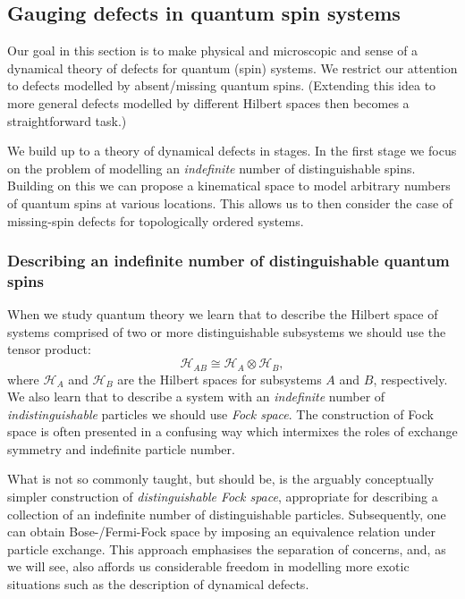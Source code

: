 
\subsection{Gauging defects in quantum spin systems}

Our goal in this section is to make physical and microscopic and sense of a dynamical theory of defects for quantum (spin) systems. We restrict our attention to defects modelled by absent/missing quantum spins. (Extending this idea to more general defects modelled by different Hilbert spaces then becomes a straightforward task.)

We build up to a theory of dynamical defects in stages. In the first stage we focus on the problem of modelling an \emph{indefinite} number of distinguishable spins. Building on this we can propose a kinematical space to model arbitrary numbers of quantum spins at various locations. This allows us to then consider the case of missing-spin defects for topologically ordered systems.

\subsubsection{Describing an indefinite number of distinguishable quantum spins}

When we study quantum theory we learn that to describe the Hilbert space of systems comprised of two or more distinguishable subsystems we should use the tensor product:
\begin{equation}
	\mathcal{H}_{AB} \cong \mathcal{H}_A\otimes \mathcal{H}_B,
\end{equation}
where $\mathcal{H}_A$ and $\mathcal{H}_B$ are the Hilbert spaces for subsystems $A$ and $B$, respectively. We also learn that to describe a system with an \emph{indefinite} number of \emph{indistinguishable} particles we should use \emph{Fock space}. The construction of Fock space is often presented in a confusing way which intermixes the roles of exchange symmetry and indefinite particle number.

What is not so commonly taught, but should be, is the arguably conceptually simpler construction of \emph{distinguishable Fock space}, appropriate for describing a collection of an indefinite number of distinguishable particles. Subsequently, one can obtain Bose-/Fermi-Fock space by imposing an equivalence relation under particle exchange. This approach emphasises the separation of concerns, and, as we will see, also affords us considerable freedom in modelling more exotic situations such as the description of dynamical defects.


